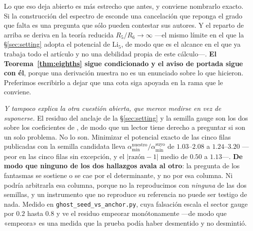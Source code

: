 \documentclass[11pt,a4paper]{article}
\newcommand{\amin}{\alpha_{\min}}
\begin{document}
\begin{itemize}
Lo que eso deja abierto es más estrecho que antes, y conviene nombrarlo exacto. Si la construcción
del espectro de \cite{KM25} esconde una cancelación que reponga el grado que falta es una pregunta
que sólo pueden contestar sus autores. Y el reparto de arriba se deriva en la teoría reducida
$R_5/R_6\to\infty$ ---el mismo límite en el que la \S\ref{sec:setting} adopta el potencial de
$\mathrm{Li}_5$, de modo que es el alcance en el que ya trabaja todo el artículo y no una
debilidad propia de este cálculo---. \textbf{El Teorema~\ref{thm:eighths} sigue condicionado y el
aviso de portada sigue con él}, porque una derivación nuestra no es un enunciado sobre lo que
\cite{KM25} hicieron. Preferimos escribirlo a dejar que una cota siga apoyada en la rama que le
conviene.

\emph{Y tampoco explica la otra cuestión abierta, que merece medirse en vez de suponerse.} El
residuo del anclaje de la \S\ref{sec:setting} y la semilla gauge son los dos sobre los
coeficientes de \cite{KM25}, de modo que un lector tiene derecho a preguntar si son un solo
problema. No lo son. Minimizar el potencial exacto de las cinco filas publicadas con la semilla
candidata lleva $\amin^{\text{nuestro}}/\amin^{\text{suyo}}$ de $1.03$--$2.08$ a $1.24$--$3.20$
---peor en las cinco filas sin excepción, y el $|\text{razón}-1|$ medio de $0.50$ a $1.13$---.
\textbf{De modo que ninguno de los dos hallazgos avala al otro}: la pregunta de los fantasmas se
sostiene o se cae por el determinante, y no por esa columna. Ni podría arbitrarla esa columna,
porque no la reproducimos con \emph{ninguna} de las dos semillas, y un instrumento que no
reproduce su referencia no puede ser testigo de nada. Medido en
\texttt{ghost\_\allowbreak seed\_\allowbreak vs\_\allowbreak anchor.py}, cuya falsación escala
el sector gauge por $0.2$ hasta $0.8$ y ve el residuo empeorar monótonamente ---de modo que
«empeora» es una medida que la prueba podía haber desmentido y no desmintió.


\end{itemize}
\end{document}
